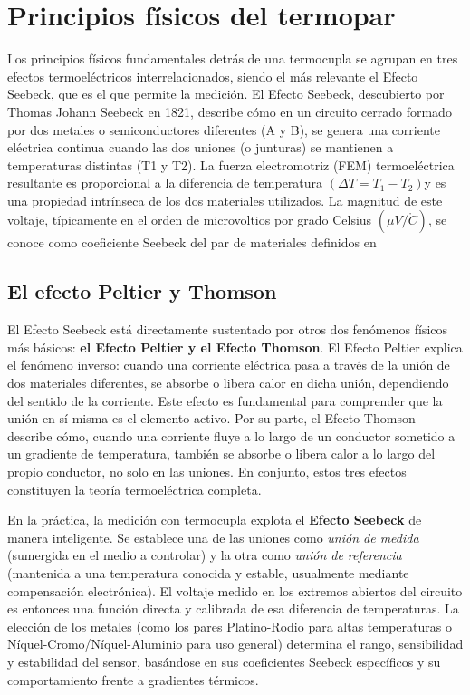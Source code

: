 \section*{Principios físicos del termopar}

Los principios físicos fundamentales detrás de una termocupla se agrupan en tres efectos termoeléctricos interrelacionados, siendo el más relevante el Efecto Seebeck, que es el que permite la medición. El Efecto Seebeck, descubierto por Thomas Johann Seebeck en 1821, describe cómo en un circuito cerrado formado por dos metales o semiconductores diferentes (A y B), se genera una corriente eléctrica continua cuando las dos uniones (o junturas) se mantienen a temperaturas distintas (T1 y T2). La fuerza electromotriz (FEM) termoeléctrica resultante es proporcional a la diferencia de temperatura $(\Delta T = T_1 - T_2) $y es una propiedad intrínseca de los dos materiales utilizados. La magnitud de este voltaje, típicamente en el orden de microvoltios por grado Celsius $(\mu V/\mathring{C})$, se conoce como coeficiente Seebeck del par de materiales definidos en \cite{instrumentacion_electronica}

\subsection*{El efecto Peltier y Thomson}
El Efecto Seebeck está directamente sustentado por otros dos fenómenos físicos más básicos: \textbf{el Efecto Peltier y el Efecto Thomson}. El Efecto Peltier explica el fenómeno inverso: cuando una corriente eléctrica pasa a través de la unión de dos materiales diferentes, se absorbe o libera calor en dicha unión, dependiendo del sentido de la corriente. Este efecto es fundamental para comprender que la unión en sí misma es el elemento activo. Por su parte, el Efecto Thomson describe cómo, cuando una corriente fluye a lo largo de un conductor sometido a un gradiente de temperatura, también se absorbe o libera calor a lo largo del propio conductor, no solo en las uniones. En conjunto, estos tres efectos constituyen la teoría termoeléctrica completa.

En la práctica, la medición con termocupla explota el \textbf{Efecto Seebeck} de manera inteligente. Se establece una de las uniones como \textit{unión de medida} (sumergida en el medio a controlar) y la otra como \textit{unión de referencia} (mantenida a una temperatura conocida y estable, usualmente mediante compensación electrónica). El voltaje medido en los extremos abiertos del circuito es entonces una función directa y calibrada de esa diferencia de temperaturas. La elección de los metales (como los pares Platino-Rodio para altas temperaturas o Níquel-Cromo/Níquel-Aluminio para uso general) determina el rango, sensibilidad y estabilidad del sensor, basándose en sus coeficientes Seebeck específicos y su comportamiento frente a gradientes térmicos.


